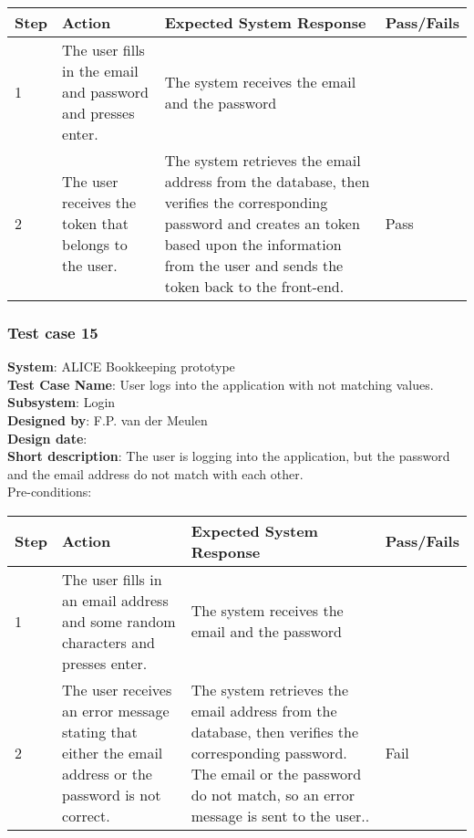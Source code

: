 \begin{longtable}{ | p{0.8cm} | p{4.5cm} | p{6cm} | p{1.5cm} |}
\hline
Step & Action & Expected System Response & Pass/Fails  \\ \hline
1 & The user fills in the email and password and presses enter. & The system receives the email and the password &  \\ \hline
2 & The user receives the token that belongs to the user. & The system retrieves the email address from the database, then verifies the corresponding password and creates an token based upon the information from the user and sends the token back to the front-end. & Pass \\ \hline
\end{longtable}

\subsubsection{Test case 15}
\textbf{System}:  ALICE Bookkeeping prototype \\
\textbf{Test Case Name}:  User logs into the application with not matching values. \\
\textbf{Subsystem}:  Login \\
\textbf{Designed by}:  F.P. van der Meulen\\
\textbf{Design date}:  \\
\textbf{Short description}: The user is logging into the application, but the password and the email address do not match with each other. \\

Pre-conditions: \\

\begin{longtable}{ | p{0.8cm} | p{4.5cm} | p{6cm} | p{1.5cm} |}
\hline
Step & Action & Expected System Response & Pass/Fails  \\ \hline
1 & The user fills in an email address and some random characters and presses enter. & The system receives the email and the password &  \\ \hline
2 & The user receives an error message stating that either the email address or the password is not correct. & The system retrieves the email address from the database, then verifies the corresponding password. The email or the password do not match, so an error message is sent to the user.. & Fail \\ \hline
\end{longtable}
